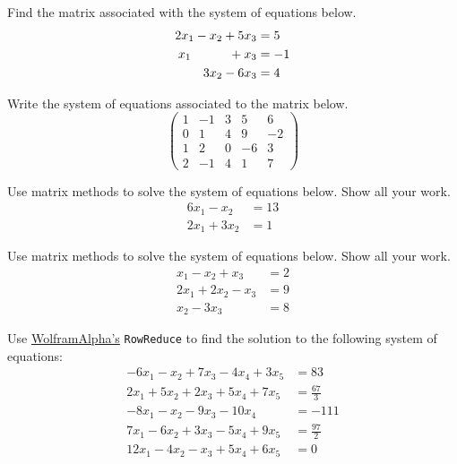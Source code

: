 \documentclass[11pt,letterpaper]{article}
\begin{document}

 Find the matrix associated with the system of equations below. 
	\[
	\begin{aligned}
	2x_1 - x_2 + 5x_3&= 5 \\
	x_1 \hspace{1.05cm} + x_3&= -1 \\
	\phantom{x -} 3x_2 - 6x_3&= 4
	\end{aligned}
	\]





\newpage





 Write the system of equations associated to the matrix below. 
	\[
	\begin{pmatrix}
	1 & -1 & 3 & 5 & 6 \\
	0 & 1 & 4 & 9 & -2 \\
	1 & 2 & 0 & -6 & 3 \\
	2 & -1 & 4 & 1 & 7 
	\end{pmatrix}
	\]





\newpage





 Use matrix methods to solve the system of equations below. Show all your work. 
	\[
	\begin{aligned}
	6x_1 - x_2&= 13 \\
	2x_1 + 3x_2&= 1
	\end{aligned}
	\]





\newpage





 Use matrix methods to solve the system of equations below. Show all your work. 
	\[
	\begin{aligned}
	x_1 - x_2 + x_3&= 2 \\
	2x_1 + 2x_2 - x_3&= 9 \\
	x_2 - 3x_3&= 8
	\end{aligned}
	\]





\newpage





 Use \href{https://www.wolframalpha.com/}{WolframAlpha's} \texttt{RowReduce} to find the solution to the following system of equations: 
	\[
	\begin{aligned}
	-6x_1 - x_2 + 7x_3 - 4x_4 + 3x_5&= 83 \\
	2x_1 + 5x_2 + 2x_3 + 5x_4 + 7x_5&= \frac{67}{3} \\
	-8x_1 - x_2 - 9x_3 - 10x_4&= -111 \\
	7x_1 - 6x_2 + 3x_3 - 5x_4 + 9x_5&= \frac{97}{2} \\
	12x_1 - 4x_2 - x_3 + 5x_4 + 6x_5&= 0
	\end{aligned}
	\]
\end{document}
